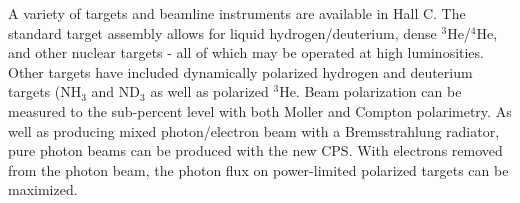 A variety of targets and beamline instruments are available in Hall C.
The standard target assembly allows for liquid
hydrogen/deuterium, dense ${}^3\textrm{He}$/${}^4\textrm{He}$, and other nuclear targets - all of
which may be operated at high luminosities.  Other targets have
included dynamically polarized hydrogen and deuterium targets
($\textrm{NH}_3$ and $\textrm{ND}_3$ as well as polarized
${}^3\textrm{He}$. Beam polarization can be measured to the
sub-percent level with both Moller and Compton polarimetry. As well as producing mixed photon/electron beam with a Bremsstrahlung
radiator, pure photon beams can be produced with the new CPS.  With electrons removed from the photon beam, the photon
flux on power-limited polarized targets can be maximized.



